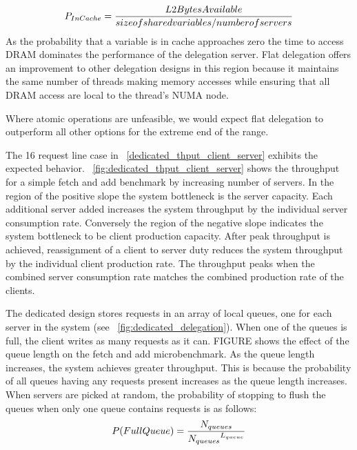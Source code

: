 \documentclass{uicthesi}
\begin{document}
\begin{displaymath}
{P_{In Cache}} = {{L2BytesAvailable} \over { size of shared variables / number of servers}}
\end{displaymath}
As the probability that a variable is in cache approaches zero the time to access DRAM dominates the performance of the delegation server. Flat delegation offers an improvement to other delegation designs in this region because it maintains the same number of threads making memory accesses while ensuring that all DRAM access are local to the thread's NUMA node. 

Where atomic operations are unfeasible, we would expect flat delegation to outperform all other options for the extreme end of the range. 





The 16 request line case in ~\ref{dedicated_thput_client_server} exhibits the expected behavior. ~\ref{fig:dedicated_thput_client_server} shows the throughput for a simple fetch and add benchmark by increasing number of servers. In the region of the positive slope the system bottleneck is the server capacity. Each additional server added increases the system throughput by the individual server consumption rate. Conversely the region of the negative slope indicates the system bottleneck to be client production capacity. After peak throughput is achieved, reassignment of a client to server duty reduces the system throughput by the individual client production rate. The throughput peaks when the combined server consumption rate matches the combined production rate of the clients. 

The dedicated design stores requests in an array of local queues, one for each server in the system (see ~\ref{fig:dedicated_delegation}).  When one of the queues is full, the client writes as many requests as it can.  FIGURE shows the effect of the queue length on the fetch and add microbenchmark. As the queue length increases, the system achieves greater throughput. This is because the probability of all queues having any requests present increases as the queue length increases. When servers are picked at random, the probability of stopping to flush the queues when only one queue contains requests is as follows: 
\begin{displaymath}
P(Full Queue) = {N_{queues} \over {N_{queues}}^{L_{queue}}}
\end{displaymath}
\end{document}
